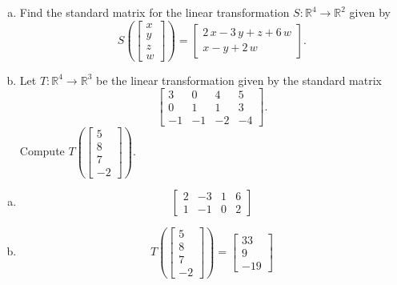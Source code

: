 
\begin{exerciseStatement}

\begin{enumerate}[(a)]
\item Find the standard matrix for the linear transformation \(S:\mathbb{R}^ 4  \to \mathbb{R}^ 2 \) given by \[S\left(  \left[\begin{array}{c}
x \\
y \\
z \\
{w}
\end{array}\right]  \right) =  \left[\begin{array}{c}
2 \, x - 3 \, y + z + 6 \, {w} \\
x - y + 2 \, {w}
\end{array}\right] .\]
\item Let \(T:\mathbb{R}^ 4  \to \mathbb{R}^ 3 \) be the linear transformation given by the standard matrix \[ \left[\begin{array}{cccc}
3 & 0 & 4 & 5 \\
0 & 1 & 1 & 3 \\
-1 & -1 & -2 & -4
\end{array}\right] .\] Compute \(T\left( \left[\begin{array}{c}
5 \\
8 \\
7 \\
-2
\end{array}\right]  \right)\). 
\end{enumerate}
    
\end{exerciseStatement}
    
\begin{exerciseAnswer} 

\begin{enumerate}[(a)]
\item \[ \left[\begin{array}{cccc}
2 & -3 & 1 & 6 \\
1 & -1 & 0 & 2
\end{array}\right] \]
\item \[T\left( \left[\begin{array}{c}
5 \\
8 \\
7 \\
-2
\end{array}\right]  \right)= \left[\begin{array}{c}
33 \\
9 \\
-19
\end{array}\right] \]
\end{enumerate}
    
\end{exerciseAnswer}
    

